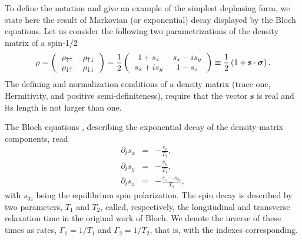 \documentclass[aps, prx, showpacs, twocolumn, superscriptaddress, notitlepage, longbibliography, floatfix, nofootinbib]{revtex4-2}
\begin{document}
\label{app:notation}

To define the notation and give an example of the simplest dephasing form, we state here the result of Markovian (or exponential) decay displayed by the Bloch equations. Let us consider the following two parametrizations of the density matrix of a spin-1/2
\begin{equation}
\rho =\left( 
\begin{tabular}{cc}
 $\rho_{\uparrow\uparrow}$ &  $\rho_{\uparrow\downarrow}$\\
  $\rho_{\downarrow\uparrow}$&  $\rho_{\downarrow\downarrow}$
\end{tabular}
\right)
=\frac{1}{2} \left( 
\begin{tabular}{cc}
 $1+s_z$ & $s_x-i s_y$\\
 $s_x+i s_y$&$1-s_z$
\end{tabular}
\right) \equiv \frac{1}{2}\left( 1 + \mathbf{s} \cdot \boldsymbol{\sigma} \right).
\label{eq:densityMatrix}
\end{equation}
The defining and normalization conditions of a density matrix (trace one, Hermitivity, and positive semi-definiteness), require that the vector $\mathbf{s}$ is real and its length is not larger than one.

The Bloch equations \cite{bloch_nuclear_1946}, describing the exponential decay of the density-matrix components, read
\begin{subequations}
\begin{eqnarray}
\partial_t s_x &=&  -\frac{s_x}{T_2},\\
\partial_t s_y &=& -\frac{s_y}{T_2},\\
\partial_t s_z &=& -\frac{s_z-s_{0z}}{T_1},
\end{eqnarray}
\label{eq:Bloch}
\end{subequations}
with
$s_{0z}$ being the equilibrium spin polarization. The spin decay is described by two parameters, $T_1$ and $T_2$, called, respectively, the longitudinal and transverse relaxation time in the original work of Bloch. We denote the inverse of these times as rates, $\Gamma_1=1/T_1$ and $\Gamma_2=1/T_2$, that is, with the indexes corresponding.
\end{document}
